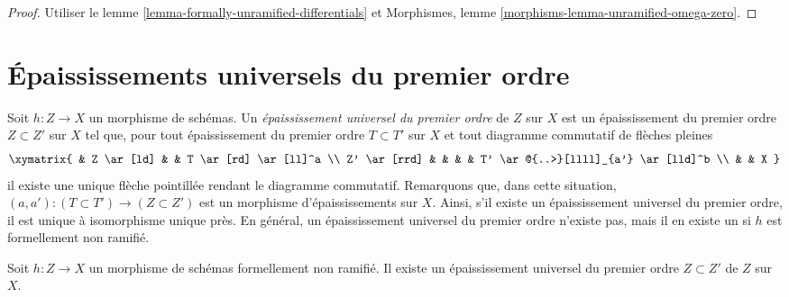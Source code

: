 \begin{proof}
Utiliser le lemme \ref{lemma-formally-unramified-differentials} et
Morphismes, lemme \ref{morphisms-lemma-unramified-omega-zero}.
\end{proof}










\section{Épaississements universels du premier ordre}
\label{section-universal-thickening}

\noindent
Soit $h : Z \to X$ un morphisme de schémas. Un {\it épaississement universel du premier
ordre} de $Z$ sur $X$ est un épaississement du premier ordre $Z \subset Z'$
sur $X$ tel que, pour tout épaississement du premier ordre $T \subset T'$
sur $X$ et tout diagramme commutatif de flèches pleines
$$
\xymatrix{
& Z \ar[ld] & & T \ar[rd] \ar[ll]^a \\
Z' \ar[rrd] & & & & T' \ar@{..>}[llll]_{a'} \ar[lld]^b \\
 & & X
}
$$
il existe une unique flèche pointillée rendant le diagramme commutatif.
Remarquons que, dans cette situation, $(a, a') : (T \subset T') \to (Z \subset Z')$
est un morphisme d'épaississements sur $X$. Ainsi, s'il existe un épaississement universel
du premier ordre, il est unique à isomorphisme unique près.
En général, un épaississement universel du premier ordre
n'existe pas, mais il en existe un si $h$ est formellement non ramifié.

\begin{lemma}
\label{lemma-universal-thickening}
Soit $h : Z \to X$ un morphisme de schémas formellement non ramifié.
Il existe un épaississement universel du premier ordre $Z \subset Z'$ de
$Z$ sur $X$.
\end{lemma}

